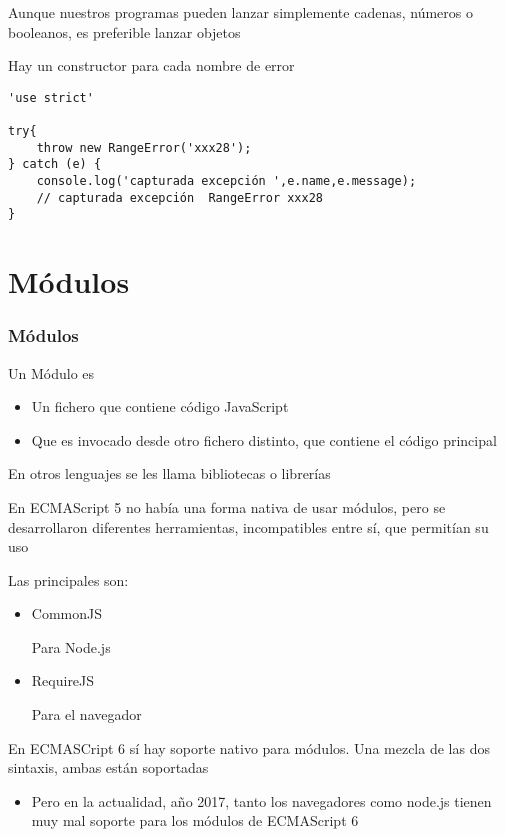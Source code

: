 \documentclass[ucs]{beamer}
\begin{document}
\begin{frame}[fragile]
\frametitle{}
Aunque nuestros programas pueden lanzar simplemente cadenas, números o booleanos,
es preferible lanzar objetos 

Hay un constructor para cada nombre de error

  \begin{scriptsize}
  \begin{verbatim}
'use strict'

try{
    throw new RangeError('xxx28');
} catch (e) {
    console.log('capturada excepción ',e.name,e.message);
    // capturada excepción  RangeError xxx28
}
  \end{verbatim}
  \end{scriptsize}
\end{frame}

\section{Módulos}
\begin{frame}[fragile]
\frametitle{Módulos}
Un Módulo es

\begin{itemize}
\item
 Un fichero que contiene código JavaScript

\item
Que es invocado desde otro fichero distinto, que contiene el código principal

\end{itemize}
En otros lenguajes se les llama bibliotecas o librerías
\end{frame}

\begin{frame}[fragile]

En ECMAScript 5 no había una forma nativa de usar módulos, pero se
desarrollaron diferentes herramientas, incompatibles entre sí, que permitían su uso

Las principales son:

    \begin{itemize}
    \item
CommonJS

Para Node.js

    \item
RequireJS

Para el navegador
    \end{itemize}

En ECMASCript 6 sí hay soporte nativo para módulos. Una mezcla de las dos sintaxis, 
ambas están soportadas


    \begin{itemize}
    \item
Pero en la actualidad, año 2017, tanto los navegadores como node.js tienen muy
mal soporte para los módulos de ECMAScript 6
    \end{itemize}

\end{frame}
\end{document}
